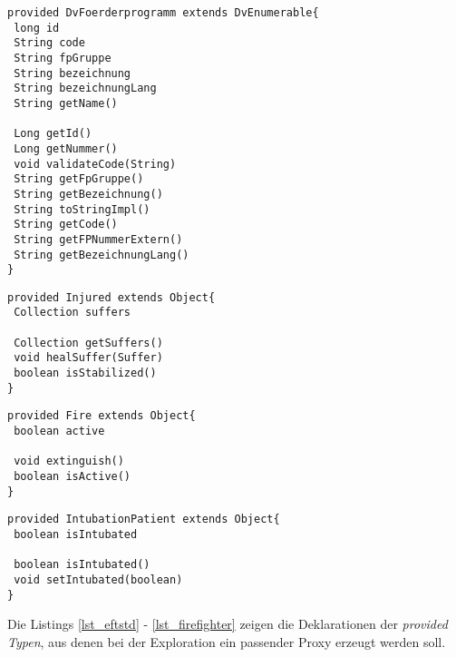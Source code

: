 \begin{lstlisting}[style = dsl, caption = Deklaration von DvFoerderprogramm, captionpos = b, label = lst_DvFoerderprogramm]
provided DvFoerderprogramm extends DvEnumerable{
 long id
 String code
 String fpGruppe
 String bezeichnung
 String bezeichnungLang
 String getName()
  
 Long getId()
 Long getNummer()
 void validateCode(String)
 String getFpGruppe()
 String getBezeichnung()
 String toStringImpl()
 String getCode()
 String getFPNummerExtern()
 String getBezeichnungLang()
}
\end{lstlisting}
\begin{lstlisting}[style = dsl, caption = Deklaration von Injured, captionpos = b, label = lst_Injured]
provided Injured extends Object{
 Collection suffers

 Collection getSuffers()
 void healSuffer(Suffer)
 boolean isStabilized()
}
\end{lstlisting}
\begin{lstlisting}[style = dsl, caption = Deklaration von Fire, captionpos = b, label = lst_Fire]
provided Fire extends Object{
 boolean active

 void extinguish()
 boolean isActive()
}
\end{lstlisting}
\begin{lstlisting}[style = dsl, caption = Deklaration von IntubationPatient, captionpos = b, label = lst_IntubationPatient]
provided IntubationPatient extends Object{
 boolean isIntubated

 boolean isIntubated()
 void setIntubated(boolean)
}
\end{lstlisting}
\noindent
Die Listings \ref{lst_eftstd} - \ref{lst_firefighter} zeigen die Deklarationen der \emph{provided Typen}, aus denen bei der Exploration ein passender Proxy erzeugt werden soll.
